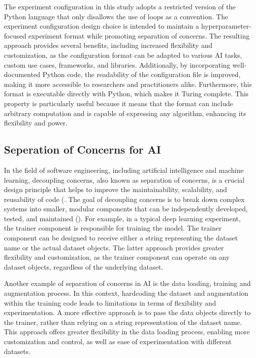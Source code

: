 \documentclass{IEEEtran}
\begin{document}
The experiment configuration in this study adopts a restricted version of the Python language that only disallows the use of loops as a convention. The experiment configuration design choice is intended to maintain a hyperparameter-focused experiment format while promoting separation of concerns. The resulting approach provides several benefits, including increased flexibility and customization, as the configuration format can be adapted to various AI tasks, custom use cases, frameworks, and libraries. Additionally, by incorporating well-documented Python code, the readability of the configuration file is improved, making it more accessible to researchers and practitioners alike. Furthermore, this format is executable directly with Python, which makes it Turing complete. This property is particularly useful because it means that the format can include arbitrary computation and is capable of expressing any algorithm, enhancing its flexibility and power.



\subsection{Seperation of Concerns for AI}

In the field of software engineering, including artificial intelligence and machine learning, decoupling concerns, also known as separation of concerns, is a crucial design principle that helps to improve the maintainability, scalability, and reusability of code (\cite{mo2016decoupling,qian2006decoupling, pressman2010software}. The goal of decoupling concerns is to break down complex systems into smaller, modular components that can be independently developed, tested, and maintained (\cite{pressman2010software, mo2016decoupling, qian2006decoupling}). For example, in a typical deep learning experiment, the trainer component is responsible for training the model. The trainer component can be designed to receive either a string representing the dataset name or the actual dataset objects. The latter approach provides greater flexibility and customization, as the trainer component can operate on any dataset objects, regardless of the underlying dataset.


Another example of separation of concerns in AI is the data loading, training and augmentation process. In this context, hardcoding the dataset and augmentation within the training code leads to limitations in terms of flexibility and experimentation. A more effective approach is to pass the data objects directly to the trainer, rather than relying on a string representation of the dataset name. This approach offers greater flexibility in the data loading process, enabling more customization and control, as well as ease of experimentation with different datasets.
\end{document}
